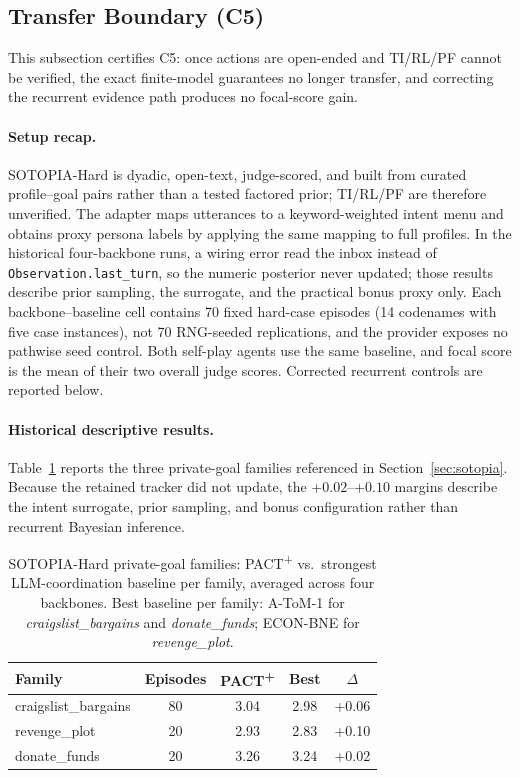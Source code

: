 \subsection{Transfer Boundary (C5)}
\label{app:sotopia-detail}

This subsection certifies C5: once actions are open-ended and TI/RL/PF cannot be verified, the exact finite-model guarantees no longer transfer, and correcting the recurrent evidence path produces no focal-score gain.

\paragraph{Setup recap.} SOTOPIA-Hard \citep{zhou2024sotopia} is dyadic, open-text, judge-scored, and built from curated profile--goal pairs rather than a tested factored prior; TI/RL/PF are therefore unverified. The adapter maps utterances to a keyword-weighted intent menu and obtains proxy persona labels by applying the same mapping to full profiles. In the historical four-backbone runs, a wiring error read the inbox instead of \texttt{Observation.last\_turn}, so the numeric posterior never updated; those results describe prior sampling, the surrogate, and the practical bonus proxy only. Each backbone--baseline cell contains 70 fixed hard-case episodes (14 codenames with five case instances), not 70 RNG-seeded replications, and the provider exposes no pathwise seed control. Both self-play agents use the same baseline, and focal score is the mean of their two overall judge scores. Corrected recurrent controls are reported below.

\paragraph{Historical descriptive results.} Table~\ref{tab:sotopia-pf-families} reports the three private-goal families referenced in Section~\ref{sec:sotopia}. Because the retained tracker did not update, the $+0.02$--$+0.10$ margins describe the intent surrogate, prior sampling, and bonus configuration rather than recurrent Bayesian inference.

\begin{table}[h]
\centering\small
\caption{SOTOPIA-Hard private-goal families: PACT\textsuperscript{+} vs.\ strongest LLM-coordination baseline per family, averaged across four backbones. Best baseline per family: A-ToM-1 for \emph{craigslist\_bargains} and \emph{donate\_funds}; ECON-BNE for \emph{revenge\_plot}.}
\label{tab:sotopia-pf-families}
\setlength{\tabcolsep}{6pt}
\begin{tabular}{@{}lcccc@{}}
\toprule
Family & Episodes & PACT\textsuperscript{+} & Best & $\Delta$ \\
\midrule
craigslist\_bargains & 80  & 3.04 & 2.98 & +0.06 \\
revenge\_plot        & 20 & 2.93 & 2.83 & +0.10 \\
donate\_funds        & 20  & 3.26 & 3.24 & +0.02 \\
\bottomrule
\end{tabular}
\end{table}

